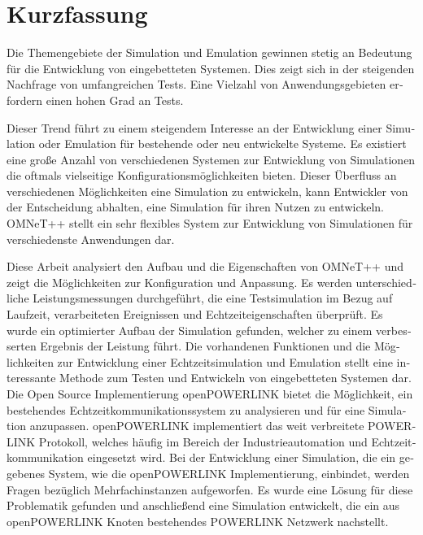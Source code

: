 
\chapter{Kurzfassung}
\begin{german}
Die Themengebiete der Simulation und Emulation gewinnen stetig an Bedeutung für die Entwicklung von eingebetteten Systemen.
Dies zeigt sich in der steigenden Nachfrage von umfangreichen Tests.
Eine Vielzahl von Anwendungsgebieten erfordern einen hohen Grad an Tests.

Dieser Trend führt zu einem steigendem Interesse an der Entwicklung einer Simulation oder Emulation für bestehende oder neu entwickelte Systeme.
Es existiert eine große Anzahl von verschiedenen Systemen zur Entwicklung von Simulationen die oftmals vielseitige Konfigurationsmöglichkeiten bieten.
Dieser Überfluss an verschiedenen Möglichkeiten eine Simulation zu entwickeln, kann Entwickler von der Entscheidung abhalten, eine Simulation für ihren Nutzen zu entwickeln.
OMNeT++ stellt ein sehr flexibles System zur Entwicklung von Simulationen für verschiedenste Anwendungen dar.

\begin{sloppypar}
Diese Arbeit analysiert den Aufbau und die Eigenschaften von OMNeT++ und zeigt die Möglichkeiten zur Konfiguration und Anpassung.
Es werden unterschiedliche Leistungsmessungen durchgeführt, die eine Testsimulation im Bezug auf Laufzeit, verarbeiteten Ereignissen und Echtzeiteigenschaften überprüft.
Es wurde ein optimierter Aufbau der Simulation gefunden, welcher zu einem verbesserten Ergebnis der Leistung führt.
Die vorhandenen Funktionen und die Möglichkeiten zur Entwicklung einer Echtzeitsimulation und Emulation stellt eine interessante Methode zum Testen und Entwickeln von eingebetteten Systemen dar.
Die Open Source Implementierung openPOWERLINK bietet die Möglichkeit, ein bestehendes Echtzeitkommunikationssystem zu analysieren und für eine Simulation anzupassen.
openPOWERLINK implementiert das weit verbreitete POWERLINK Protokoll, welches häufig im Bereich der Industrieautomation und Echtzeitkommunikation eingesetzt wird.
Bei der Entwicklung einer Simulation, die ein gegebenes System, wie die openPOWERLINK Implementierung, einbindet, werden Fragen bezüglich Mehrfachinstanzen aufgeworfen.
Es wurde eine Lösung für diese Problematik gefunden und anschließend eine Simulation entwickelt, die ein aus openPOWERLINK Knoten bestehendes POWERLINK Netzwerk nachstellt.
\end{sloppypar}
    
\end{german}
